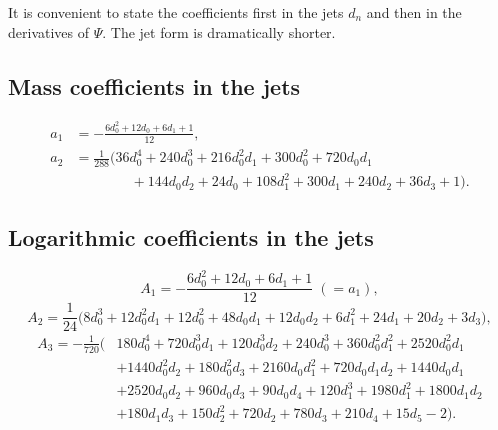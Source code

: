 \documentclass[11pt,oneside]{article}
\theoremstyle{definition}
\theoremstyle{remark}
\begin{document}
It is convenient to state the coefficients first in the jets $d_n$ and then in
the derivatives of $\Psi$.  The jet form is dramatically shorter.

\subsection{Mass coefficients in the jets}

\[
\begin{aligned}
  a_1&=-\frac{6d_0^2+12d_0+6d_1+1}{12},\\[0.3em]
  a_2&=\frac{1}{288}\bigl(36d_0^4+240d_0^3+216d_0^2d_1+300d_0^2+720d_0d_1\\
     &\qquad\qquad+144d_0d_2+24d_0+108d_1^2+300d_1+240d_2+36d_3+1\bigr).
\end{aligned}
\]

\subsection{Logarithmic coefficients in the jets}

\[
  A_1=-\frac{6d_0^2+12d_0+6d_1+1}{12}\;(=a_1),
\]
\begin{equation}\label{eq:A2jets}
  A_2=\frac{1}{24}\bigl(8d_0^3+12d_0^2d_1+12d_0^2+48d_0d_1+12d_0d_2
      +6d_1^2+24d_1+20d_2+3d_3\bigr),
\end{equation}
\begin{equation}\label{eq:A3jets}
\begin{aligned}
  A_3=-\frac{1}{720}\bigl(&180d_0^4+720d_0^3d_1+120d_0^3d_2+240d_0^3
    +360d_0^2d_1^2+2520d_0^2d_1\\
   &+1440d_0^2d_2+180d_0^2d_3+2160d_0d_1^2+720d_0d_1d_2+1440d_0d_1\\
   &+2520d_0d_2+960d_0d_3+90d_0d_4+120d_1^3+1980d_1^2+1800d_1d_2\\
   &+180d_1d_3+150d_2^2+720d_2+780d_3+210d_4+15d_5-2\bigr).
\end{aligned}
\end{equation}
\end{document}
